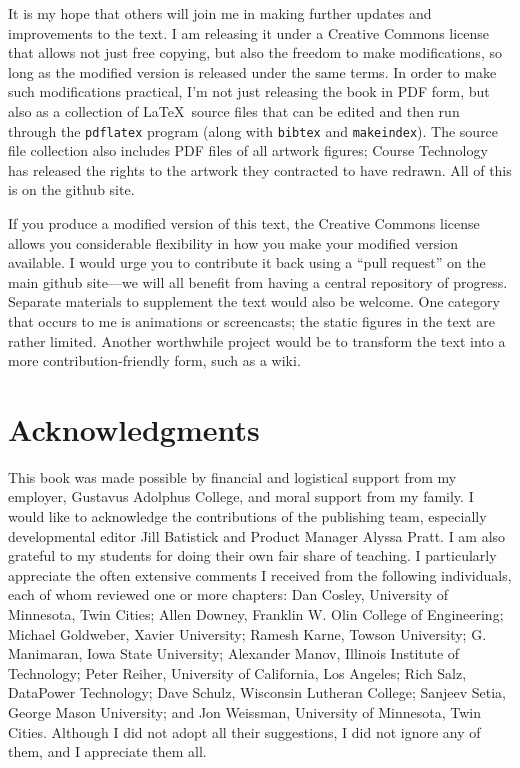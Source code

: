 It is my hope that others will join me in making further updates and improvements to the text.  I am releasing it under a Creative Commons license that allows not just free copying, but also the freedom to make modifications, so long as the modified version is released under the same terms.  In order to make such modifications practical, I'm not just releasing the book in PDF form, but also as a collection of \LaTeX\ source files that can be edited and then run through the \texttt{pdflatex} program (along with \texttt{bibtex} and \texttt{makeindex}).  The source file collection also includes PDF files of all artwork figures; Course Technology has released the rights to the artwork they contracted to have redrawn. All of this is on the github site.

If you produce a modified version of this text, the Creative Commons license allows you considerable flexibility in how you make your modified version available.  I would urge you to contribute it back using a ``pull request'' on the main github site---we will all benefit from having a central repository of progress.  Separate materials to supplement the text would also be welcome.  One category that occurs to me is animations or screencasts; the static figures in the text are rather limited. Another worthwhile project would be to transform the text into a more contribution-friendly form, such as a wiki.

\section*{Acknowledgments}

This book was made possible by financial and logistical support from
my employer, Gustavus Adolphus College, and moral support from my
family.  I would like to acknowledge the contributions of the
publishing team, especially developmental editor Jill Batistick and
Product Manager Alyssa Pratt.  I am also grateful to my students for
doing their own fair share of teaching.  I particularly appreciate the
often extensive comments I received from the following individuals,
each of whom reviewed one or more chapters: Dan Cosley, University of
Minnesota, Twin Cities; Allen Downey, Franklin W. Olin College of
Engineering; Michael Goldweber, Xavier University; Ramesh Karne,
Towson University; G. Manimaran, Iowa State University; Alexander
Manov, Illinois Institute of Technology; Peter Reiher, University of
California, Los Angeles; Rich Salz, DataPower Technology; Dave Schulz,
Wisconsin Lutheran College; Sanjeev Setia, George Mason University;
and Jon Weissman, University of Minnesota, Twin Cities.  Although I
did not adopt all their suggestions, I did not ignore any of them, and
I appreciate them all.

